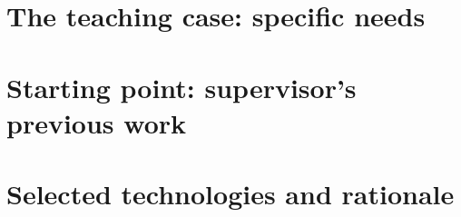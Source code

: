 \section{The teaching case: specific needs}
\label{sec:caso-docente}


\section{Starting point: supervisor's previous work}
\label{sec:punto-partida}


\section{Selected technologies and rationale}
\label{sec:tecnologias-seleccionadas}

%
